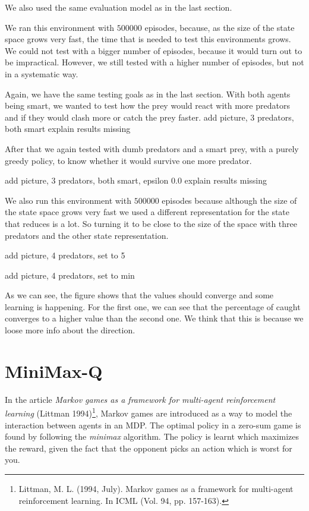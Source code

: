 \documentclass{article}
\begin{document}
We also used the same evaluation model as in the last section.

We ran this environment with $500000$ episodes, because, as the size of the state
space grows very fast, the time that is needed to test this environments grows.
We could not test with a bigger number of episodes, because it would turn out to
be impractical. However, we still tested with a higher number of episodes, but not
in a systematic way.

Again, we have the same testing goals as in the last section.  With both agents being smart, we wanted to test how the prey would react with more predators and if they would
clash more or catch the prey faster.
\error add picture, 3 predators, both smart
\error explain results missing

After that we again tested with dumb predators and a smart prey, with a purely greedy policy, to
know whether it would survive one more predator.

\error add picture, 3 predators, both smart, epsilon 0.0
\error explain results missing

We also run this environment with $500000$ episodes because although the size of
the state space grows very fast we used a different representation for the
state that reduces is a lot. So turning it to be close to the size of the space
with three predators and the other state representation.

\error add picture, 4 predators, set to 5

\error add picture, 4 predators, set to min

As we can see, the figure shows that the values should converge and some
learning is happening. For the first one, we can see that the percentage of
caught converges to a higher value than the second one. We think that this is
because we loose more info about the direction. 
\section{MiniMax-Q}
In the article \emph{Markov games as a framework for multi-agent reinforcement learning} (Littman 1994)\footnote{Littman, M. L. (1994, July). Markov games as a framework for multi-agent reinforcement learning. In ICML (Vol. 94, pp. 157-163).}, Markov games are introduced as a way to model the interaction between agents in an MDP. The optimal policy in a zero-sum game is found by following the \emph{minimax} algorithm. The policy is learnt which maximizes the reward, given the fact that the opponent picks an action which is worst for you.
\end{document}

